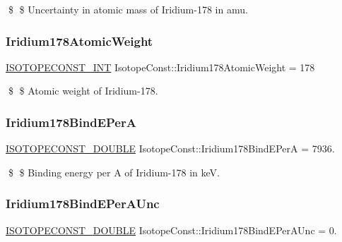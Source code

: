 \$ \$ Uncertainty in atomic mass of Iridium-\/178 in amu. \mbox{\label{group___isotope_const-_iridium-_ir178_gacd8e5519b251a31e671e1d3b9e384975}} 
\subsubsection{\texorpdfstring{Iridium178\+Atomic\+Weight}{Iridium178AtomicWeight}}
{\footnotesize\ttfamily \mbox{\hyperlink{group___isotope_const-_macros_ga5f18360b3e99483a35c32d789e62621c}{I\+S\+O\+T\+O\+P\+E\+C\+O\+N\+S\+T\+\_\+\+I\+NT}} Isotope\+Const\+::\+Iridium178\+Atomic\+Weight = 178}

\$ \$ Atomic weight of Iridium-\/178. \mbox{\label{group___isotope_const-_iridium-_ir178_ga4668c0ea5ecea06c9439b2e37ae3a3dc}} 
\subsubsection{\texorpdfstring{Iridium178\+Bind\+E\+PerA}{Iridium178BindEPerA}}
{\footnotesize\ttfamily \mbox{\hyperlink{group___isotope_const-_macros_ga8f45a7272ce02c0b4c65c44636ed719a}{I\+S\+O\+T\+O\+P\+E\+C\+O\+N\+S\+T\+\_\+\+D\+O\+U\+B\+LE}} Isotope\+Const\+::\+Iridium178\+Bind\+E\+PerA = 7936.}

\$ \$ Binding energy per A of Iridium-\/178 in keV. \mbox{\label{group___isotope_const-_iridium-_ir178_ga5fe39a932581f25696ad7eca813b0157}} 
\subsubsection{\texorpdfstring{Iridium178\+Bind\+E\+Per\+A\+Unc}{Iridium178BindEPerAUnc}}
{\footnotesize\ttfamily \mbox{\hyperlink{group___isotope_const-_macros_ga8f45a7272ce02c0b4c65c44636ed719a}{I\+S\+O\+T\+O\+P\+E\+C\+O\+N\+S\+T\+\_\+\+D\+O\+U\+B\+LE}} Isotope\+Const\+::\+Iridium178\+Bind\+E\+Per\+A\+Unc = 0.}

